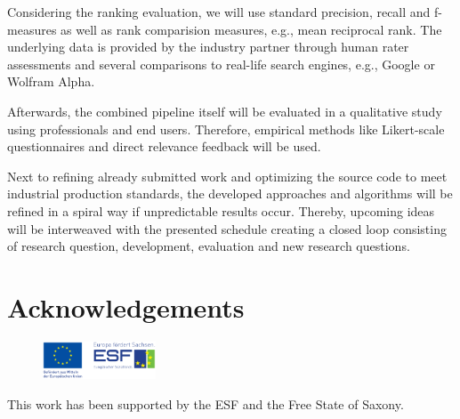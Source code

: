 Considering the ranking evaluation, we will use standard precision, recall and f-measures as well as rank comparision measures, e.g., mean reciprocal rank. 
The underlying data is provided by the industry partner through human rater assessments and several comparisons to real-life search engines, e.g., Google or Wolfram Alpha.

Afterwards, the combined pipeline itself will be evaluated in a qualitative study using professionals and end users.
Therefore, empirical methods like Likert-scale questionnaires and direct relevance feedback will be used.


Next to refining already submitted work and optimizing the source code to meet industrial production standards, the developed approaches and algorithms will be refined in a spiral way if unpredictable results occur.
Thereby, upcoming ideas will be interweaved with the presented schedule creating a closed loop consisting of research question, development, evaluation and new research questions.


\section*{Acknowledgements}
\begin{figure}
 \vspace{-10mm}
 \includegraphics[width=0.3\textwidth]{figures/esf.pdf}
\end{figure}
This work has been supported by the ESF and the Free State of Saxony.




%

